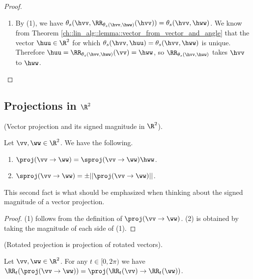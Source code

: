 \begin{proof}
\begin{enumerate}
		That is, $\theta_s(\vv, \RR_t(\vv)) = s(\xx, \hvv, \widehat{\RR_t(\vv)}) = t$, as desired.
		
		\item By (1), we have $\theta_s(\hvv, \RR_{\theta_s(\hvv, \hww)}(\hvv)) = \theta_s(\hvv, \hww)$. We know from Theorem \ref{ch::lin_alg::lemma::vector_from_vector_and_angle} that the vector $\huu \in \R^2$ for which $\theta_s(\hvv, \huu) = \theta_s(\hvv, \hww)$ is unique. Therefore $\huu = \RR_{\theta_s(\hvv, \hww)}(\vv) = \hww$, so $\RR_{\theta_s(\hvv, \hww)}$ takes $\hvv$ to $\hww$.        
	\end{enumerate}
\end{proof}

\subsection*{Projections in $\R^2$}

\begin{theorem}
\label{ch::lin_alg::thm::vector_proj_Signed_magnitude}
    (Vector projection and its signed magnitude in $\R^2$).

    Let $\vv, \ww \in \R^2$. We have the following.
    
    \begin{enumerate}
        \item $\proj(\vv \rightarrow \ww) = \sproj(\vv \rightarrow \ww) \hww$.
        \item $\sproj(\vv \rightarrow \ww) = \pm ||\proj(\vv \rightarrow \ww)||$.
    \end{enumerate}

    This second fact is what should be emphasized when thinking about the signed magnitude of a vector projection.
\end{theorem}

\begin{proof}
    (1) follows from the definition of $\proj(\vv \rightarrow \ww)$. (2) is obtained by taking the magnitude of each side of (1).
\end{proof}

\begin{lemma}
    \label{ch::lin_alg::lemma::rotated_projection}
    (Rotated projection is projection of rotated vectors). 
    
    Let $\vv, \ww \in \R^2$. For any $t \in [0, 2\pi)$ we have $\RR_t(\proj(\vv \rightarrow \ww)) = \proj(\RR_t(\vv) \rightarrow \RR_t(\ww))$.
\end{lemma}

